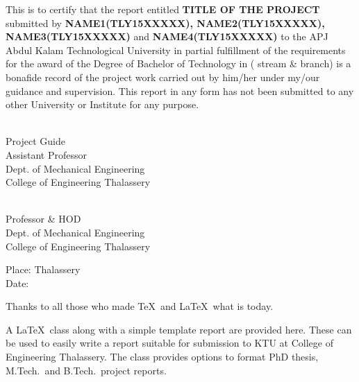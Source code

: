 \documentclass[BTech]{cetlyproj}
\begin{document}
\noindent This is to certify that the report entitled {\large \bf TITLE OF THE PROJECT} submitted by {\bf NAME1(TLY15XXXXX), NAME2(TLY15XXXXX), NAME3(TLY15XXXXX)} and {\bf NAME4(TLY15XXXXX)} to the APJ Abdul Kalam Technological University in partial fulfillment of the requirements for the award of the Degree of Bachelor of Technology in ( stream \& branch) is a bonafide record of the project work carried out by him/her under my/our guidance and supervision. This report in any form has not been submitted to any other University or Institute for any purpose.

\vspace*{1.0in}

\begin{singlespacing}
\hspace*{-0.25in}
\parbox{2.5in}{
 \\
\noindent Project Guide \\ 
\noindent Assistant Professor \\
\noindent Dept. of Mechanical Engineering\\
\noindent College of Engineering Thalassery \\
} 
\hspace*{0.7in} 
\parbox{2.5in}{
 \\
\noindent Professor \& HOD \\ 
\noindent Dept. of Mechanical Engineering\\
\noindent College of Engineering Thalassery \\
}  
\end{singlespacing}
\vspace*{0.25in}

\noindent Place: Thalassery\\
Date: 


\acknowledgements

Thanks to all those who made \TeX\ and \LaTeX\ what is today.


\abstract


\vspace*{24pt}

\noindent A \LaTeX\ class along with a simple template report are
provided here.  These can be used to easily write a report suitable for submission to KTU at College of Engineering Thalassery.  The class provides options to format PhD thesis, M.Tech.\ and B.Tech.\ project reports. 
\end{document}
